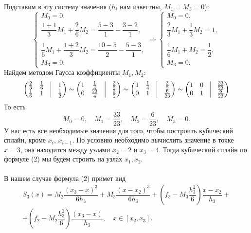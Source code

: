 \documentclass[a4paper, 12pt]{article}
\begin{document}
\begin{enumerate}
	Подставим в эту систему значения ($h_i$ нам известны, $M_1 = M_3 = 0$):
	$$\begin{cases}
		M_0 = 0,\\
		\dfrac{1 + 1}{3}M_1 + \dfrac{2}{6}M_{2} = \dfrac{5 - 3}{1} - \dfrac{3 - 2}{1},\\\\
		\dfrac{1}{6}M_{1} + \dfrac{1+2}{3}M_2 = \dfrac{10 - 5}{2} - \dfrac{5 - 3}{1},\\
		M_3=0.
	\end{cases}
	\Rightarrow 
	\begin{cases}
		M_0 = 0,\\
		\dfrac{2}{3}M_1 + \dfrac{1}{3}M_{2} = 1,\\\\
		\dfrac{1}{6}M_{1} + M_2 = \dfrac12,\\
		M_3=0.
	\end{cases}$$
	Найдем методом Гаусса коэффициенты $M_1, M_2$:
	$$
	\begin{pmatrix}
		\frac23&\frac16&\vline&1\\
		\frac16&1&\vline&\frac12
	\end{pmatrix}
	\sim
	\begin{pmatrix}
		1&\frac14&\vline&\frac32\\
		0&\frac{23}{4}&\vline&\frac32
	\end{pmatrix}
	\sim 
	\begin{pmatrix}
		1&\frac14&\vline&\frac32\\
		0&1&\vline&\frac{6}{23}
	\end{pmatrix}
	\sim
	\begin{pmatrix}
		1&0&\vline&\frac{33}{23}\\
		0&1&\vline&\frac{6}{23}
	\end{pmatrix}$$
	То есть $$M_0 = 0,\quad M_1 = \dfrac{33}{23},\quad M_2 = \dfrac{6}{23},\quad M_3 = 0.$$
	У нас есть все необходимые значения для того, чтобы построить кубический сплайн, кроме $x_i$, $x_{i-1}$. По условию необходимо вычислить значение в точке $x=3$, она находится между узлами $x_2 = 2$ и $x_3 = 4$. Тогда кубический сплайн по формуле (2) мы будем строить на узлах $x_1, x_2$.\\\\
	В нашем случае формула (2) примет вид 
	\begin{multline*}
		S_3(x) = M_2\dfrac{(x_3 - x)^3}{6h_3} + M_{3}\dfrac{(x-x_2)^3}{6h_3} + \left(f_3 - M_3\dfrac{h_3^2}{6}\right)\dfrac{x-x_2}{h_3} +\\+ \left(f_2 - M_2\dfrac{h_3^2}{6}\right)\dfrac{(x_3 - x)}{h_3},\quad x\in [x_2, x_3].

\end{multline*}
\end{enumerate}
\end{document}
